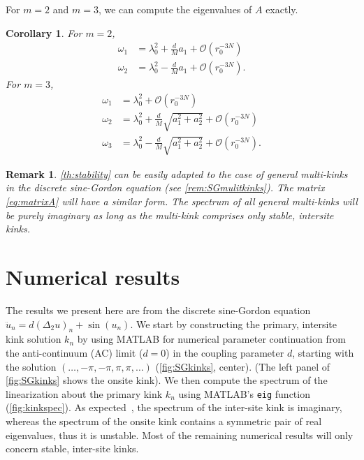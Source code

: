 \documentclass[12pt,reqno]{amsart}
\newtheorem{corollary}{Corollary}
\newtheorem{remark}{Remark}
\begin{document}
\noindent For $m = 2$ and $m = 3$, we can compute the eigenvalues of $A$ exactly.

\begin{corollary}\label{corr:m23}
For $m = 2$, 
\begin{align*}
	\omega_1 &= \lambda_0^2 + \frac{d}{M}a_1 + \mathcal{O}(r_0^{-3N}) \\
	\omega_2 &= \lambda_0^2 - \frac{d}{M}a_1 + \mathcal{O}(r_0^{-3N}).
\end{align*}
For $m = 3$,
\begin{align*}
	\omega_1 &= \lambda_0^2 + \mathcal{O}(r_0^{-3N}) \\
	\omega_2 &= \lambda_0^2 + \frac{d}{M}\sqrt{a_1^2 + a_2^2} + \mathcal{O}(r_0^{-3N}) \\
	\omega_3 &= \lambda_0^2 - \frac{d}{M}\sqrt{a_1^2 + a_2^2} + \mathcal{O}(r_0^{-3N}).
\end{align*}
\end{corollary}

\begin{remark}
\cref{th:stability} can be easily adapted to the case of general multi-kinks in the discrete sine-Gordon equation (see \cref{rem:SGmulitkinks}). The matrix \cref{eq:matrixA} will have a similar form. The spectrum of all general multi-kinks will be purely imaginary as long as the multi-kink comprises only stable, intersite kinks.
\end{remark}

\section{Numerical results}\label{sec:numerics}

The results we present here are from the discrete sine-Gordon equation
$
\ddot{u}_n = d (\Delta_2 u)_n + \sin(u_n)
$.
We start by constructing the primary, intersite kink solution $k_n$ by using MATLAB for numerical parameter continuation from the anti-continuum (AC) limit ($d = 0$) in the coupling parameter $d$, starting with the solution $(\dots, -\pi, -\pi, \pi, \pi, \dots)$ (\cref{fig:SGkinks}, center). (The left panel of \cref{fig:SGkinks} shows the onsite kink). We then compute the spectrum of the linearization about the primary kink $k_n$ using MATLAB's \texttt{eig} function (\cref{fig:kinkspec}). As expected~\cites{Balmforth2000,KevrekidisWeinstein2000}, the spectrum of the inter-site kink is imaginary, whereas the spectrum of the onsite kink contains a symmetric pair of real eigenvalues, thus it is unstable. Most of the remaining numerical results will only concern stable, inter-site kinks.
\end{document}
